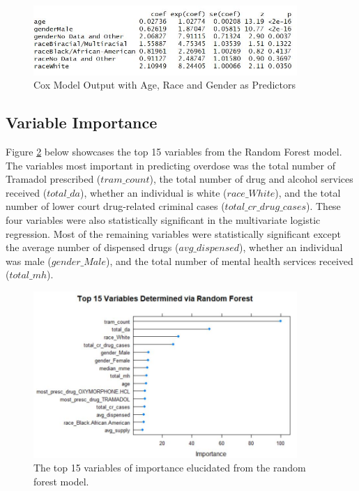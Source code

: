 \documentclass[twoside,10.5pt]{article}
\begin{document}
\begin{figure}[htp]
\centering
\includegraphics[width=10cm]{images/cox_model.JPG}
\caption{Cox Model Output with Age, Race and Gender as Predictors}
\label{fig:cox_model}
\end{figure}

\subsection{Variable Importance}
Figure \ref{fig:var_importance} below showcases the top 15 variables from the Random Forest model. The variables most important in predicting overdose was the total number of Tramadol prescribed ($tram\_count$), the total number of drug and alcohol services received ($total\_da$), whether an individual is white ($race\_White$), and the total number of lower court drug-related criminal cases ($total\_cr\_drug\_cases$). These four variables were also statistically significant in the multivariate logistic regression. Most of the remaining variables were statistically significant except the average number of dispensed drugs ($avg\_dispensed$), whether an individual was male ($gender\_Male$), and the total number of mental health services received ($total\_mh$). 

\begin{figure}[h!]
\centering
\includegraphics[width=10cm]{images/variable_importance.JPG}
\caption{The top 15 variables of importance elucidated from the random forest model.}
\label{fig:var_importance}
\end{figure}
\end{document}
